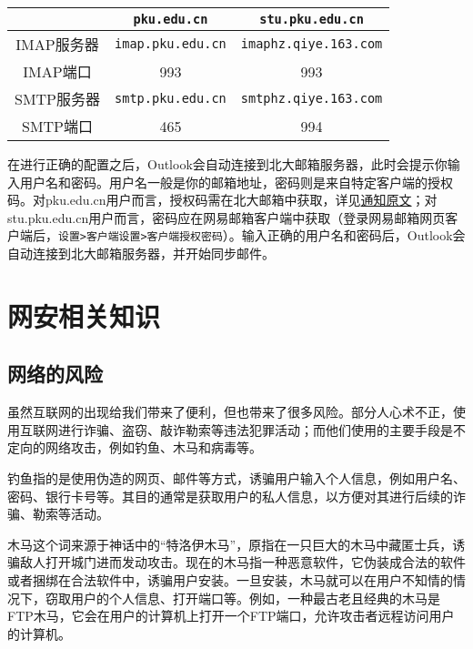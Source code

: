 \begin{table}[ht]
  \centering
  \begin{tabular}{c|c|c}
    \hline
    & \texttt{pku.edu.cn} & \texttt{stu.pku.edu.cn} \\
    \hline
    IMAP服务器 & \texttt{imap.pku.edu.cn} & \texttt{imaphz.qiye.163.com} \\
    IMAP端口 & 993 & 993 \\
    \hline
    SMTP服务器 & \texttt{smtp.pku.edu.cn} & \texttt{smtphz.qiye.163.com} \\
    SMTP端口 & 465 & 994 \\
    \hline
  \end{tabular}
\end{table}

在进行正确的配置之后，Outlook会自动连接到北大邮箱服务器，此时会提示你输入用户名和密码。用户名一般是你的邮箱地址，密码则是来自特定客户端的授权码。对pku.edu.cn用户而言，授权码需在北大邮箱中获取，详见\href{https://its.pku.edu.cn/announce/tz20250702100126.jsp}{通知原文}；对stu.pku.edu.cn用户而言，密码应在网易邮箱客户端中获取（登录网易邮箱网页客户端后，\texttt{设置>客户端设置>客户端授权密码}）。输入正确的用户名和密码后，Outlook会自动连接到北大邮箱服务器，并开始同步邮件。

\section{网安相关知识} %

\subsection{网络的风险}

虽然互联网的出现给我们带来了便利，但也带来了很多风险。部分人心术不正，使用互联网进行诈骗、盗窃、敲诈勒索等违法犯罪活动；而他们使用的主要手段是不定向的网络攻击，例如钓鱼、木马和病毒等。

钓鱼指的是使用伪造的网页、邮件等方式，诱骗用户输入个人信息，例如用户名、密码、银行卡号等。其目的通常是获取用户的私人信息，以方便对其进行后续的诈骗、勒索等活动。

木马这个词来源于神话中的“特洛伊木马”，原指在一只巨大的木马中藏匿士兵，诱骗敌人打开城门进而发动攻击。现在的木马指一种恶意软件，它伪装成合法的软件或者捆绑在合法软件中，诱骗用户安装。一旦安装，木马就可以在用户不知情的情况下，窃取用户的个人信息、打开端口等。例如，一种最古老且经典的木马是FTP木马，它会在用户的计算机上打开一个FTP端口，允许攻击者远程访问用户的计算机。

